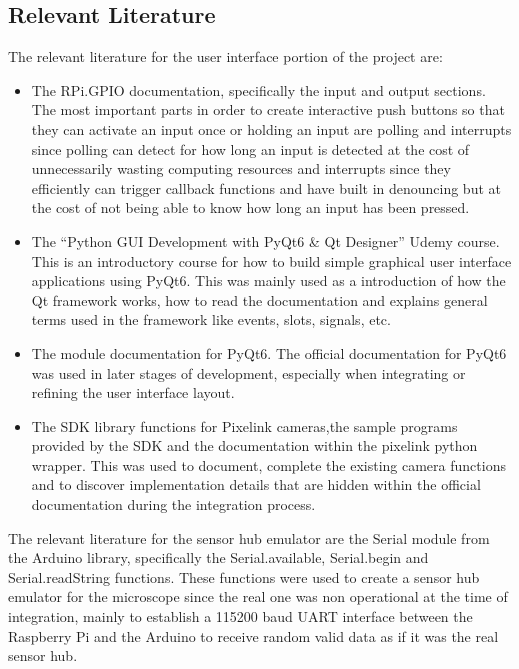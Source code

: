 \subsection{Relevant Literature}
The relevant literature for the user interface portion of the project are:
\begin{itemize}
	\item The RPi.GPIO documentation, specifically the input and output sections.\cite{RaspberrygpiopythonWikiExamples} The most important parts in order to create interactive push buttons so that they can activate an input once or holding an input are polling and interrupts since polling can detect for how long an input is detected at the cost of unnecessarily wasting computing resources and interrupts since they efficiently can trigger callback functions and have built in denouncing but at the cost of not being able to know how long an input has been pressed.
	\item The ``Python GUI Development with PyQt6 \& Qt Designer'' Udemy course.\cite{PythonGUIDevelopmenta} This is an introductory course for how to build simple graphical user interface applications using PyQt6. This was mainly used as a introduction of how the Qt framework works, how to read the documentation and explains general terms used in the framework like events, slots, signals, etc.
	\item The module documentation for PyQt6.\cite{ModulesPyQtDocumentation} The official documentation for PyQt6 was used in later stages of development, especially when integrating or refining the user interface layout.
	\item The SDK library functions for Pixelink cameras,the sample programs provided by the SDK and the documentation within the pixelink python wrapper.\cite{WhatFunctionsFeatures} This was used to document, complete the existing camera functions and to discover implementation details that are hidden within the official documentation during the integration process.
\end{itemize}
The relevant literature for the sensor hub emulator are the Serial module from the Arduino library, specifically the Serial.available, Serial.begin and Serial.readString functions.\cite{SerialAvailableArduino, SerialBeginArduino, SerialReadStringArduino} These functions were used to create a sensor hub emulator for the microscope since the real one was non operational at the time of integration, mainly to establish a 115200 baud UART interface between the Raspberry Pi and the Arduino to receive random valid data as if it was the real sensor hub.
